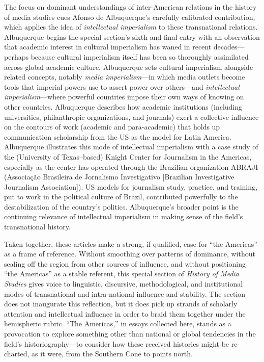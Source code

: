 \documentclass{tufte-handout}
\begin{document}
The focus on dominant understandings of inter-American relations in the
history of media studies cues Afonso de Albuquerque's carefully
calibrated contribution, which applies the idea of \emph{intellectual
imperialism} to these transnational relations. Albuquerque begins the
special section's sixth and final entry with an observation that
academic interest in cultural imperialism has waned in recent
decades---perhaps because cultural imperialism itself has been so
thoroughly assimilated across global academic culture. Albuquerque sets
cultural imperialism alongside related concepts, notably \emph{media
imperialism}---in which media outlets become tools that imperial powers
use to assert power over others---and \emph{intellectual
imperialism}---where powerful countries impose their own ways of knowing
on other countries. Albuquerque describes how academic institutions
(including universities, philanthropic organizations, and journals)
exert a collective influence on the contours of work (academic and
para-academic) that holds up communication scholarship from the US as
the model for Latin America. Albuquerque illustrates this mode of
intellectual imperialism with a case study of the (University of
Texas--based) Knight Center for Journalism in the Americas, especially
as the center has operated through the Brazilian organization ABRAJI
(Associação Brasileira de Jornalismo Investigativo {[}Brazilian
Investigative Journalism Association{]}). US models for journalism
study, practice, and training, put to work in the political culture of
Brazil, contributed powerfully to the destabilization of the country's
politics. Albuquerque's broader point is the continuing relevance of
intellectual imperialism in making sense of the field's transnational
history.

Taken together, these articles make a strong, if qualified, case for
``the Americas'' as a frame of reference. Without smoothing over
patterns of dominance, without sealing off the region from other sources
of influence, and without positioning ``the Americas'' as a stable
referent, this special section of \emph{History of Media Studies} gives
voice to linguistic, discursive, methodological, and institutional modes
of transnational and intra-national influence and stability. The section
does not inaugurate this reflection, but it does pick up strands of
scholarly attention and intellectual influence in order to braid them
together under the hemispheric rubric. ``The Americas,'' in essays
collected here, stands as a provocation to explore something other than
national or global tendencies in the field's historiography---to
consider how these received histories might be re-charted, as it were,
from the Southern Cone to points north.
\end{document}
